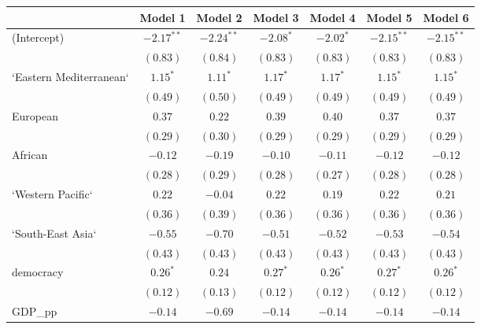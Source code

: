 
\begin{table}[!h]
\begin{center}
\begin{tabular}{l c c c c c c }
\toprule
 & Model 1 & Model 2 & Model 3 & Model 4 & Model 5 & Model 6 \\
\midrule
(Intercept)             & $-2.17^{**}$ & $-2.24^{**}$ & $-2.08^{*}$  & $-2.02^{*}$  & $-2.15^{**}$ & $-2.15^{**}$ \\
                        & $(0.83)$     & $(0.84)$     & $(0.83)$     & $(0.83)$     & $(0.83)$     & $(0.83)$     \\
`Eastern Mediterranean` & $1.15^{*}$   & $1.11^{*}$   & $1.17^{*}$   & $1.17^{*}$   & $1.15^{*}$   & $1.15^{*}$   \\
                        & $(0.49)$     & $(0.50)$     & $(0.49)$     & $(0.49)$     & $(0.49)$     & $(0.49)$     \\
European                & $0.37$       & $0.22$       & $0.39$       & $0.40$       & $0.37$       & $0.37$       \\
                        & $(0.29)$     & $(0.30)$     & $(0.29)$     & $(0.29)$     & $(0.29)$     & $(0.29)$     \\
African                 & $-0.12$      & $-0.19$      & $-0.10$      & $-0.11$      & $-0.12$      & $-0.12$      \\
                        & $(0.28)$     & $(0.29)$     & $(0.28)$     & $(0.27)$     & $(0.28)$     & $(0.28)$     \\
`Western Pacific`       & $0.22$       & $-0.04$      & $0.22$       & $0.19$       & $0.22$       & $0.21$       \\
                        & $(0.36)$     & $(0.39)$     & $(0.36)$     & $(0.36)$     & $(0.36)$     & $(0.36)$     \\
`South-East Asia`       & $-0.55$      & $-0.70$      & $-0.51$      & $-0.52$      & $-0.53$      & $-0.54$      \\
                        & $(0.43)$     & $(0.43)$     & $(0.43)$     & $(0.43)$     & $(0.43)$     & $(0.43)$     \\
democracy               & $0.26^{*}$   & $0.24$       & $0.27^{*}$   & $0.26^{*}$   & $0.27^{*}$   & $0.26^{*}$   \\
                        & $(0.12)$     & $(0.13)$     & $(0.12)$     & $(0.12)$     & $(0.12)$     & $(0.12)$     \\
GDP\_pp                 & $-0.14$      & $-0.69$      & $-0.14$      & $-0.14$      & $-0.14$      & $-0.14$      \\

\end{tabular}
\end{center}
\end{table}
